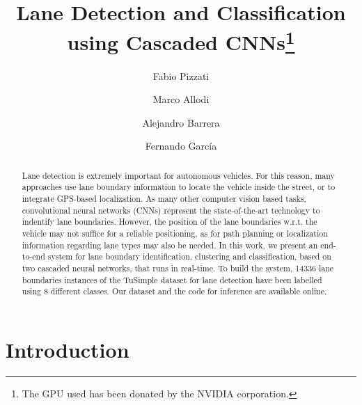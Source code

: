 \documentclass[runningheads]{llncs}
\begin{document}
\title{Lane Detection and Classification using Cascaded CNNs\thanks{The GPU used has been donated by the NVIDIA corporation.}}
\author{Fabio Pizzati\and
Marco Allodi\and
Alejandro Barrera\and
Fernando García}

\maketitle              \begin{abstract}
Lane detection is extremely important for autonomous vehicles. For this reason, many approaches use lane boundary information to locate the vehicle inside the street, or to integrate GPS-based localization. As many other computer vision based tasks, convolutional neural networks (CNNs) represent the state-of-the-art technology to indentify lane boundaries. However, the position of the lane boundaries w.r.t. the vehicle may not suffice for a reliable positioning, as for path planning or localization information regarding lane types may also be needed. In this work, we present an end-to-end system for lane boundary identification, clustering and classification, based on two cascaded neural networks, that runs in real-time. To build the system, 14336 lane boundaries instances of the TuSimple dataset for lane detection have been labelled using 8 different classes. Our dataset and the code for inference are available online.

\end{abstract}
\section{Introduction}\label{introduction}
\end{document}
